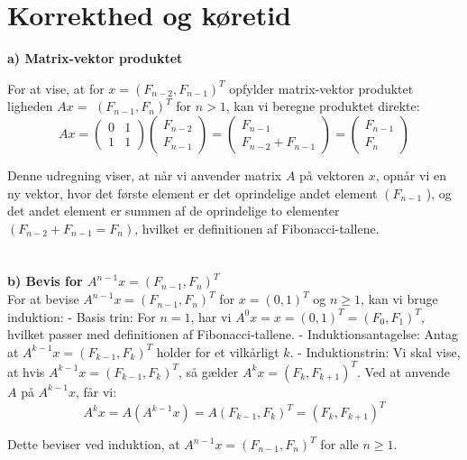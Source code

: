 \documentclass{article}
\begin{document}
\section{Korrekthed og køretid}

\textbf{a) Matrix-vektor produktet}

For at vise, at for $x=\left(F_{n-2}, F_{n-1}\right)^T$ opfylder matrix-vektor produktet ligheden $A x=$ $\left(F_{n-1}, F_n\right)^T$ for $n>1$, kan vi beregne produktet direkte:
$$
A x=\left(\begin{array}{ll}
0 & 1 \\
1 & 1
\end{array}\right)\left(\begin{array}{c}
F_{n-2} \\
F_{n-1}
\end{array}\right)=\left(\begin{array}{c}
F_{n-1} \\
F_{n-2}+F_{n-1}
\end{array}\right)=\left(\begin{array}{c}
F_{n-1} \\
F_n
\end{array}\right)
$$

Denne udregning viser, at når vi anvender matrix $A$ på vektoren $x$, opnår vi en ny vektor, hvor det første element er det oprindelige andet element $\left(F_{n-1}\right.$ ), og det andet element er summen af de oprindelige to elementer $\left(F_{n-2}+F_{n-1}=F_n\right)$, hvilket er definitionen af Fibonacci-tallene.
\\
\\
\\

\textbf{b) Bevis for $A^{n-1} x=\left(F_{n-1}, F_n\right)^T$}
\\

For at bevise $A^{n-1} x=\left(F_{n-1}, F_n\right)^T$ for $x=(0,1)^T$ og $n \geq 1$, kan vi bruge induktion:
- Basis trin: For $n=1$, har vi $A^0 x=x=(0,1)^T=\left(F_0, F_1\right)^T$, hvilket passer med definitionen af Fibonacci-tallene.
- Induktionsantagelse: Antag at $A^{k-1} x=\left(F_{k-1}, F_k\right)^T$ holder for et vilkårligt $k$.
- Induktionstrin: Vi skal vise, at hvis $A^{k-1} x=\left(F_{k-1}, F_k\right)^T$, så gælder $A^k x=\left(F_k, F_{k+1}\right)^T$. Ved at anvende $A$ på $A^{k-1} x$, får vi:
$$
A^k x=A\left(A^{k-1} x\right)=A\left(F_{k-1}, F_k\right)^T=\left(F_k, F_{k+1}\right)^T
$$

Dette beviser ved induktion, at $A^{n-1} x=\left(F_{n-1}, F_n\right)^T$ for alle $n \geq 1$.
\\
\\
\end{document}
